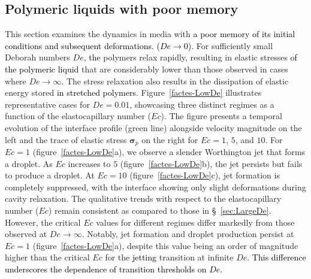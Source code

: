 \documentclass{jfm}
\newcommand{\DL}[1]{{\textcolor{black}{#1}}}
\newcommand{\VS}[1]{{\textcolor{black}{#1}}}
\newcommand{\AO}[1]{{\textcolor{black}{#1}}}
\begin{document}
\subsection{Polymeric liquids with poor memory}
\label{sec:shortmemory}

This section examines the dynamics in media with \VS{a poor memory of its initial conditions and subsequent deformations. ($De \to 0$)}.
For sufficiently small Deborah numbers $De$, \DL{the} polymers relax rapidly, resulting in elastic stresses \DL{of the polymeric liquid} that are considerably lower than those observed in cases where $De \to \infty$. The stress relaxation also results in the dissipation of elastic energy stored \AO{in stretched polymers}. Figure~\ref{factes-LowDe} illustrates representative cases for $De = 0.01$, showcasing three distinct regimes as a function of the elastocapillary number ($Ec$). The figure presents a temporal evolution of the interface profile (green line) alongside velocity magnitude on the left and the trace of elastic stress $\boldsymbol{\sigma}_p$ on the right for $Ec = 1$, $5$, and $10$. For $Ec = 1$ (figure~\ref{factes-LowDe}a), we observe a slender Worthington jet that forms a droplet.
As $Ec$ increases to $5$ (figure~\ref{factes-LowDe}b), the jet persists but fails to produce a droplet.
At $Ec = 10$ (figure~\ref{factes-LowDe}c), jet formation is completely suppressed, with the interface showing only slight deformations during cavity relaxation.
The qualitative trends with respect to the elastocapillary number ($Ec$) remain consistent as compared to those in \S~\ref{sec:LargeDe}. However, the critical $Ec$ values for different regimes differ markedly from those observed at $De \to \infty$. Notably, jet formation and droplet production persist at $Ec = 1$ (figure~\ref{factes-LowDe}a), despite this value being an order of magnitude higher than the critical $Ec$ for the \VS{jetting} transition at infinite $De$. \AO{This difference underscores the dependence of transition thresholds on $De$.}
\end{document}
